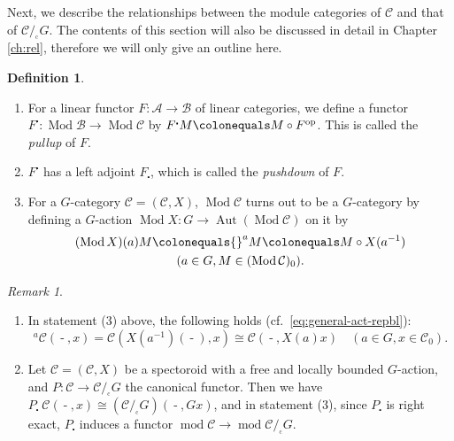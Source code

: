 \documentclass{surv-l}
\numberwithin{equation}{chapter}
\numberwithin{figure}{chapter}
\theoremstyle{plain}
\theoremstyle{definition}
\newtheorem{dfn}[thm]{Definition}
\theoremstyle{remark}
\newtheorem{rmk}[thm]{Remark}
\newcommand{\corbit}{/\!_{_{\mathrm{c}}}}
\DeclareMathOperator{\Aut}{Aut}
\DeclareMathOperator{\Mod}{Mod}
\DeclareMathOperator{\blank}{-}
\begin{document}
Next, we describe the relationships between the module categories of
${\mathcal{C}}$ and that 
of ${\mathcal{C}}\corbit G$.
The contents of this section will also be discussed in detail in Chapter \ref{ch:rel},
therefore we will only give an outline here.

\begin{dfn}\leavevmode
\label{dfn:module}
\begin{enumerate}
\item For a linear functor $F\colon \mathcal{A} \to \mathcal{B}$ of linear categories,
we define a functor
$F^{\centerdot} \colon \Mod \mathcal{B} \to \Mod {\mathcal{C}}$
by $F^{\centerdot} M\colonequals  M\circ F^{\mathrm{op}}$.
This is called the \emph{pullup} of $F$.
\item $F^{\centerdot}$ has a left adjoint $F_{\centerdot}$, which is called
the \emph{pushdown} of $F$.
\item For a $G$-category ${\mathcal{C}} = ({\mathcal{C}}, X)$,
$\Mod {\mathcal{C}}$ turns out to be a $G$-category by defining
a $G$-action
$\Mod X \colon G \to \Aut(\Mod {\mathcal{C}})$
on it by
\[
\begin{gathered}
(\Mod X)(a)M\colonequals  {}^aM\colonequals  M \circ X(a^{-1})\\
(a \in G, M \in (\Mod {\mathcal{C}})_0).
\end{gathered}
\]
\end{enumerate}
\end{dfn}

\begin{rmk}\leavevmode
\begin{enumerate}
\item In statement (3) above, the following holds (cf.\ \eqref{eq:general-act-repbl}):
\begin{equation}\label{cls-act-repbl}
{}^{a}{\mathcal{C}}(\blank, x) = {\mathcal{C}}(X(a^{-1})(\blank),x) \cong {\mathcal{C}}(\blank, X(a)x)
\quad (a \in G, x \in {\mathcal{C}}_0).
\end{equation}
\item Let ${\mathcal{C}} = ({\mathcal{C}}, X)$ be a spectoroid
with a free and locally bounded $G$-action, and
$P\colon {\mathcal{C}} \to {\mathcal{C}}\corbit G$ the canonical functor.
Then we have
$P_{\centerdot} {\ }{\mathcal{C}}(\blank, x) \cong ({\mathcal{C}}\corbit G)(\blank, Gx)$,
and in statement (3), since $P_{\centerdot}$ is right exact,
$P_{\centerdot}$ induces a functor
$\operatorname{mod} {\mathcal{C}} \to \operatorname{mod} {\mathcal{C}}\corbit G$.
\end{enumerate}
\end{rmk}
\end{document}
